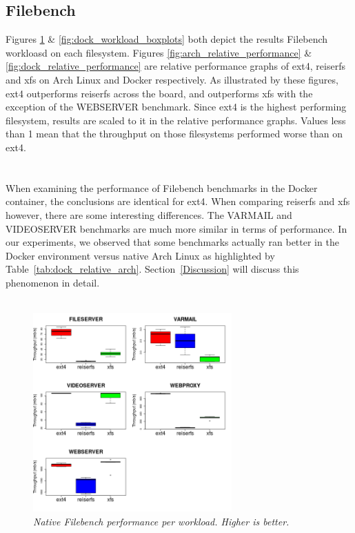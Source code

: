 \documentclass[letterpaper,twocolumn,10pt]{article}
\begin{document}
\subsection{Filebench}
Figures \ref{fig:arch_workload_boxplots} \& \ref{fig:dock_workload_boxplots} both depict the results Filebench workloasd on each filesystem. Figures \ref{fig:arch_relative_performance} \& \ref{fig:dock_relative_performance} are relative performance graphs of ext4, reiserfs and xfs on Arch Linux and Docker respectively. As illustrated by these figures, ext4 outperforms reiserfs across the board, and outperforms xfs with the exception of the WEBSERVER benchmark. Since ext4 is the highest performing filesystem, results are scaled to it in the relative performance graphs. Values less than 1 mean that the throughput on those filesystems performed worse than on ext4. 
\\

\noindent{}
\\\\

When examining the performance of Filebench benchmarks in the Docker container, the conclusions are identical for ext4. When comparing reiserfs and xfs however, there are some interesting differences. The VARMAIL and VIDEOSERVER benchmarks are much more similar in terms of performance. In our experiments, we observed that some benchmarks actually ran better in the Docker environment versus native Arch Linux as highlighted by Table~\ref{tab:dock_relative_arch}. Section~\ref{Discussion} will discuss this phenomenon in detail. 
\\

\noindent{}
\\


\begin{figure}[!ht]
\centering
\includegraphics[width=3in]{../results/arch_workload_boxplots.png}
\caption{\textit{Native Filebench performance per workload. Higher is better.}}
\label{fig:arch_workload_boxplots}
\end{figure}
\end{document}
